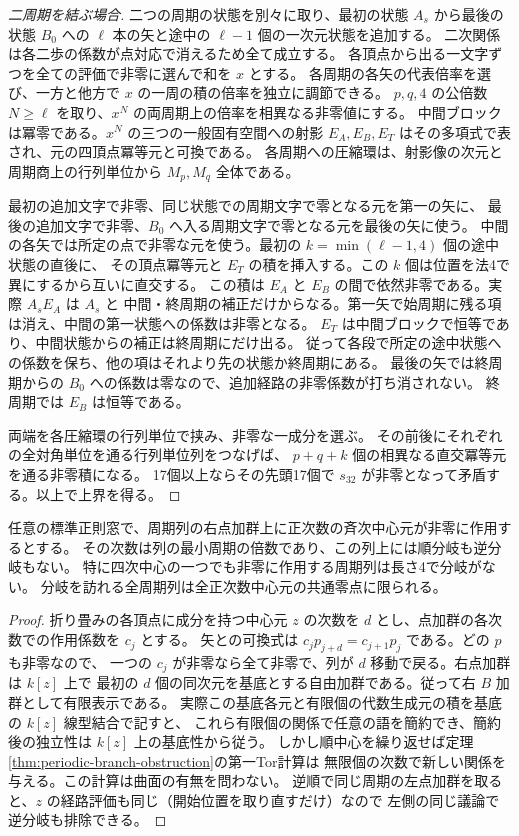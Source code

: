 \begin{proof}[二周期を結ぶ場合]
二つの周期の状態を別々に取り、最初の状態 $A_s$ から最後の状態 $B_0$ への
$\ell$ 本の矢と途中の $\ell-1$ 個の一次元状態を追加する。
二次関係は各二歩の係数が点対応で消えるため全て成立する。
各頂点から出る一文字ずつを全ての評価で非零に選んで和を $x$ とする。
各周期の各矢の代表倍率を選び、一方と他方で $x$ の一周の積の倍率を独立に調節できる。
$p,q,4$ の公倍数 $N\ge\ell$ を取り、$x^N$ の両周期上の倍率を相異なる非零値にする。
中間ブロックは冪零である。$x^N$ の三つの一般固有空間への射影 $E_A,E_B,E_T$
はその多項式で表され、元の四頂点冪等元と可換である。
各周期への圧縮環は、射影像の次元と周期商上の行列単位から $M_p,M_q$ 全体である。

最初の追加文字で非零、同じ状態での周期文字で零となる元を第一の矢に、
最後の追加文字で非零、$B_0$ へ入る周期文字で零となる元を最後の矢に使う。
中間の各矢では所定の点で非零な元を使う。最初の $k=\min(\ell-1,4)$ 個の途中状態の直後に、
その頂点冪等元と $E_T$ の積を挿入する。この $k$ 個は位置を法4で異にするから互いに直交する。
この積は $E_A$ と $E_B$ の間で依然非零である。実際 $A_s E_A$ は $A_s$ と
中間・終周期の補正だけからなる。第一矢で始周期に残る項は消え、中間の第一状態への係数は非零となる。
$E_T$ は中間ブロックで恒等であり、中間状態からの補正は終周期にだけ出る。
従って各段で所定の途中状態への係数を保ち、他の項はそれより先の状態か終周期にある。
最後の矢では終周期からの $B_0$ への係数は零なので、追加経路の非零係数が打ち消されない。
終周期では $E_B$ は恒等である。

両端を各圧縮環の行列単位で挟み、非零な一成分を選ぶ。
その前後にそれぞれの全対角単位を通る行列単位列をつなげば、
$p+q+k$ 個の相異なる直交冪等元を通る非零積になる。
17個以上ならその先頭17個で $s_{32}$ が非零となって矛盾する。以上で上界を得る。
\end{proof}

\begin{corollary}\label{cor:periodic-branch-central-basepoints}
任意の標準正則窓で、周期列の右点加群上に正次数の斉次中心元が非零に作用するとする。
その次数は列の最小周期の倍数であり、この列上には順分岐も逆分岐もない。
特に四次中心の一つでも非零に作用する周期列は長さ4で分岐がない。
分岐を訪れる全周期列は全正次数中心元の共通零点に限られる。
\end{corollary}
\begin{proof}
折り畳みの各頂点に成分を持つ中心元 $z$ の次数を $d$ とし、点加群の各次数での作用係数を $c_j$ とする。
矢との可換式は $c_j p_{j+d}=c_{j+1}p_j$ である。どの $p$ も非零なので、
一つの $c_j$ が非零なら全て非零で、列が $d$ 移動で戻る。右点加群は $k[z]$ 上で
最初の $d$ 個の同次元を基底とする自由加群である。従って右 $B$ 加群として有限表示である。
実際この基底各元と有限個の代数生成元の積を基底の $k[z]$ 線型結合で記すと、
これら有限個の関係で任意の語を簡約でき、簡約後の独立性は $k[z]$ 上の基底性から従う。
しかし順中心を繰り返せば定理\ref{thm:periodic-branch-obstruction}の第一Tor計算は
無限個の次数で新しい関係を与える。この計算は曲面の有無を問わない。
逆順で同じ周期の左点加群を取ると、$z$ の経路評価も同じ（開始位置を取り直すだけ）なので
左側の同じ議論で逆分岐も排除できる。
\end{proof}
